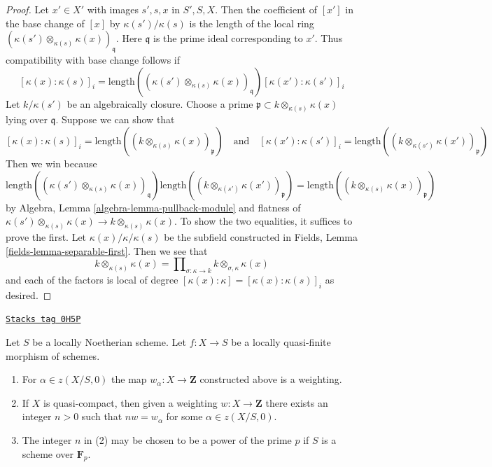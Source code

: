 \begin{proof}
Let $x' \in X'$ with images $s', s, x$ in $S', S, X$.
Then the coefficient of $[x']$ in
the base change of $[x]$ by $\kappa(s')/\kappa(s)$ is the length of
the local ring $(\kappa(s') \otimes_{\kappa(s)} \kappa(x))_\mathfrak q$.
Here $\mathfrak q$ is the prime ideal corresponding to $x'$.
Thus compatibility with base change follows if
$$
[\kappa(x) : \kappa(s)]_i =
\text{length}((\kappa(s') \otimes_{\kappa(s)} \kappa(x))_\mathfrak q)
[\kappa(x') : \kappa(s')]_i
$$
Let $k/\kappa(s')$ be an algebraically closure. Choose a prime
$\mathfrak p \subset k \otimes_{\kappa(s)} \kappa(x)$ lying
over $\mathfrak q$. Suppose we can show that
$$
[\kappa(x) : \kappa(s)]_i =
\text{length}((k \otimes_{\kappa(s)} \kappa(x))_\mathfrak p)
\quad\text{and}\quad
[\kappa(x') : \kappa(s')]_i =
\text{length}((k \otimes_{\kappa(s')} \kappa(x'))_\mathfrak p)
$$
Then we win because
$$
\text{length}((\kappa(s') \otimes_{\kappa(s)} \kappa(x))_\mathfrak q)
\text{length}((k \otimes_{\kappa(s')} \kappa(x'))_\mathfrak p)
=
\text{length}((k \otimes_{\kappa(s)} \kappa(x))_\mathfrak p)
$$
by Algebra, Lemma \ref{algebra-lemma-pullback-module} and flatness of
$\kappa(s') \otimes_{\kappa(s)} \kappa(x) \to k \otimes_{\kappa(s)} \kappa(x)$.
To show the two equalities, it suffices to prove the first.
Let $\kappa(x)/\kappa/\kappa(s)$ be the subfield constructed in
Fields, Lemma \ref{fields-lemma-separable-first}. Then we see that
$$
k \otimes_{\kappa(s)} \kappa(x) =
\prod\nolimits_{\sigma : \kappa \to k}
k \otimes_{\sigma, \kappa} \kappa(x)
$$
and each of the factors is local of degree
$[\kappa(x) : \kappa] = [\kappa(x) : \kappa(s)]_i$
as desired.
\end{proof}

\begin{lemma}[Weightings]
\label{relative-cycles-lemma-weightings}
\href{https://stacks.math.columbia.edu/tag/0H5P}{\texttt{Stacks tag 0H5P}}

Let $S$ be a locally Noetherian scheme. Let $f : X \to S$ be a locally
quasi-finite morphism of schemes.
\begin{enumerate}
\item For $\alpha \in z(X/S, 0)$ the map $w_\alpha : X \to \mathbf{Z}$
constructed above is a weighting.
\item If $X$ is quasi-compact, then given a weighting
$w : X \to \mathbf{Z}$ there exists an integer $n > 0$ such
that $nw = w_\alpha$ for some $\alpha \in z(X/S, 0)$.
\item The integer $n$ in (2) may be chosen to be a power of
the prime $p$ if $S$ is a scheme over $\mathbf{F}_p$.
\end{enumerate}
\end{lemma}

